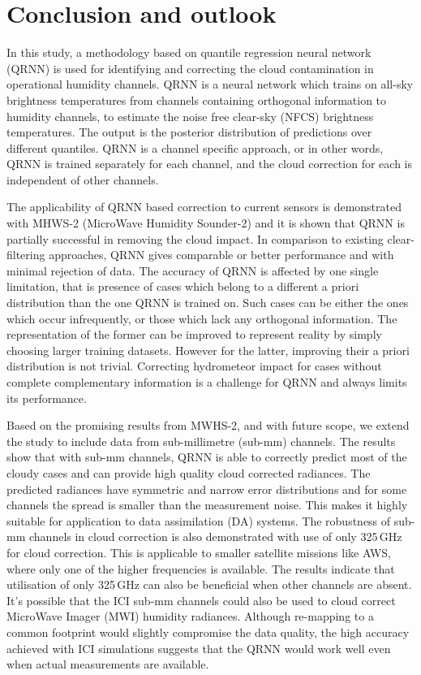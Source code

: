 \documentclass[amt, manuscript]{copernicus}
\begin{document}
\section{Conclusion and outlook}  %
\label{conclusions}
%

In this study, a methodology based on quantile regression neural network (QRNN) is used for identifying and correcting the cloud contamination in operational humidity channels. QRNN is a neural network which trains on all-sky brightness temperatures from  channels containing orthogonal information to humidity channels, to estimate the noise free clear-sky (NFCS) brightness temperatures. The output is the posterior distribution of predictions over different quantiles. QRNN is a channel specific approach, or in other words, QRNN is trained separately for each channel, and the cloud correction for each is independent of other channels. 

The applicability of QRNN based correction to current sensors is demonstrated with MHWS-2 (MicroWave Humidity Sounder-2) and it is shown that QRNN is partially successful in removing the cloud impact. In comparison to existing clear-filtering approaches, QRNN gives comparable or better performance and with minimal rejection of data. The accuracy of QRNN is affected by one single limitation, that is presence of cases which belong to a different a priori distribution than the one QRNN is trained on. Such cases can be either the ones which occur infrequently, or those which lack any orthogonal information. The representation of the former can be improved to represent reality by simply choosing larger training datasets. However for the latter, improving their a priori distribution is not trivial. Correcting hydrometeor impact for cases without complete complementary information is a challenge for QRNN and always limits its performance.

Based on the promising results from MWHS-2, and with future scope, we extend the study to include data from sub-millimetre (sub-mm) channels. The results show that with  sub-mm channels, QRNN is able to correctly predict most of the cloudy cases and can provide high quality cloud corrected radiances. The predicted radiances have symmetric and narrow error distributions and for some channels the spread is smaller than the measurement noise. This makes it highly suitable for application to data assimilation (DA) systems. The robustness of sub-mm channels in cloud correction is also demonstrated with use of only 325\,GHz for cloud correction. This is applicable to smaller satellite missions like AWS, where only one of the higher frequencies is available. The results indicate that utilisation of only 325\,GHz can also be beneficial when other channels are absent. It's possible that the ICI sub-mm channels could also be used to cloud correct MicroWave Imager (MWI) humidity radiances. Although re-mapping to a common footprint would slightly compromise the data quality, the high accuracy achieved with ICI simulations suggests that the QRNN would work well even when actual measurements are available.
\end{document}
